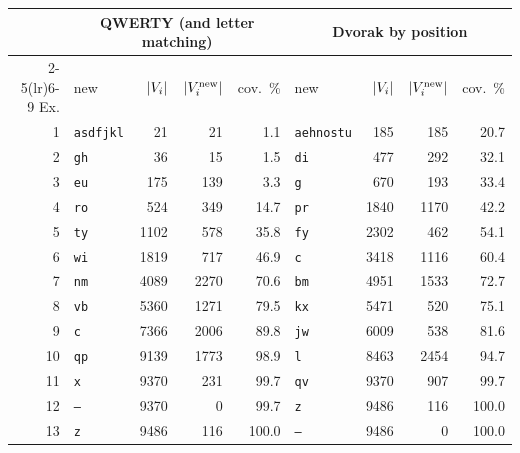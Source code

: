 \begin{center}\small
\begin{tabular}{@{}rlrrrlrrr@{}}
\toprule
& \multicolumn{4}{c}{QWERTY (and letter matching)} & \multicolumn{4}{c}{Dvorak by position} \\
\cmidrule(lr){2-5}\cmidrule(lr){6-9}
Ex. & new & $|V_i|$ & $|V_i^{\mathrm{new}}|$ & cov.\ \% & new & $|V_i|$ & $|V_i^{\mathrm{new}}|$ & cov.\ \% \\
\midrule
1 & \texttt{asdfjkl} & 21 & 21 & 1.1 & \texttt{aehnostu} & 185 & 185 & 20.7 \\
2 & \texttt{gh} & 36 & 15 & 1.5 & \texttt{di} & 477 & 292 & 32.1 \\
3 & \texttt{eu} & 175 & 139 & 3.3 & \texttt{g} & 670 & 193 & 33.4 \\
4 & \texttt{ro} & 524 & 349 & 14.7 & \texttt{pr} & 1840 & 1170 & 42.2 \\
5 & \texttt{ty} & 1102 & 578 & 35.8 & \texttt{fy} & 2302 & 462 & 54.1 \\
6 & \texttt{wi} & 1819 & 717 & 46.9 & \texttt{c} & 3418 & 1116 & 60.4 \\
7 & \texttt{nm} & 4089 & 2270 & 70.6 & \texttt{bm} & 4951 & 1533 & 72.7 \\
8 & \texttt{vb} & 5360 & 1271 & 79.5 & \texttt{kx} & 5471 & 520 & 75.1 \\
9 & \texttt{c} & 7366 & 2006 & 89.8 & \texttt{jw} & 6009 & 538 & 81.6 \\
10 & \texttt{qp} & 9139 & 1773 & 98.9 & \texttt{l} & 8463 & 2454 & 94.7 \\
11 & \texttt{x} & 9370 & 231 & 99.7 & \texttt{qv} & 9370 & 907 & 99.7 \\
12 & \texttt{--} & 9370 & 0 & 99.7 & \texttt{z} & 9486 & 116 & 100.0 \\
13 & \texttt{z} & 9486 & 116 & 100.0 & \texttt{--} & 9486 & 0 & 100.0 \\
\bottomrule
\end{tabular}
\end{center}